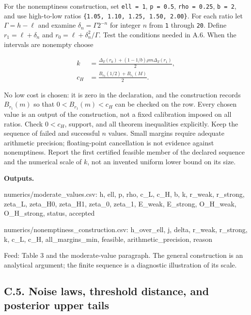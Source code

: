 \documentclass[
  11pt,
]{article}
\newenvironment{Shaded}{}{}
\newcommand{\NormalTok}[1]{#1}
\newcounter{none} %
\begin{document}
For the nonemptiness construction, set \texttt{ell\ =\ 1},
\texttt{p\ =\ 0.5}, \texttt{rho\ =\ 0.25}, \texttt{b\ =\ 2}, and use
high-to-low ratios \texttt{\{1.05,\ 1.10,\ 1.25,\ 1.50,\ 2.00\}}. For
each ratio let \(\Gamma=h-\ell\) and examine \(\delta_n=\Gamma2^{-n}\) for
integer \(n\) from \texttt{1} through \texttt{20}. Define
\(r_1=\ell+\delta_n\) and \(r_0=\ell+\delta_n^2/\Gamma\). Test the conditions needed in A.6. When
the intervals are nonempty choose

\[
\begin{aligned}
k&=\frac{\Delta_T(r_0)+(1-1/b)\rho m\Delta_T(r_1)}2,\\
c_H&=\frac{B_{r_0}(1/2)+B_{r_1}(M)}2.
\end{aligned}
\tag{OA.78}\label{eq:oa-oa-78}
\]

No low cost is chosen: it is zero in the declaration, and the construction
records \(B_{r_1}(m)\) so that \(0<B_{r_1}(m)<c_H\) can be checked on the row.
Every chosen value is an output of the construction, not a fixed
calibration imposed on all ratios. Check \(0<c_H\), support, and all
theorem inequalities explicitly. Keep the sequence of failed and
successful \(n\) values. Small margins require adequate arithmetic
precision; floating-point cancellation is not evidence against
nonemptiness. Report the first certified feasible member of the declared
sequence and the numerical scale of \(k\), not an invented uniform lower
bound on its size.

\textbf{Outputs.}

\begin{Shaded}
\begin{Highlighting}[]
\NormalTok{numerics/moderate\_values.csv:}
\NormalTok{h, ell, p, rho, c\_L, c\_H, b, k, r\_weak, r\_strong,}
\NormalTok{zeta\_L, zeta\_H0, zeta\_H1, zeta\_0, zeta\_1,}
\NormalTok{E\_weak, E\_strong, O\_H\_weak, O\_H\_strong, status, accepted}

\NormalTok{numerics/nonemptiness\_construction.csv:}
\NormalTok{h\_over\_ell, j, delta, r\_weak, r\_strong, k, c\_L, c\_H,}
\NormalTok{all\_margins\_min, feasible, arithmetic\_precision, reason}
\end{Highlighting}
\end{Shaded}

Feed: Table 3 and the moderate-value paragraph. The general construction
is an analytical argument; the finite sequence is a diagnostic
illustration of its scale.

\subsection{C.5. Noise laws, threshold distance, and posterior upper
tails}\label{oa-c-noise}
\end{document}
